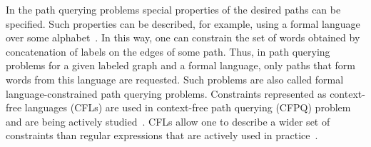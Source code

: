 In the path querying problems special properties of the desired paths can be specified. Such properties can be described, for example, using a formal language over some alphabet~\cite{barrett2000formal}. In this way, one can constrain the set of words obtained by concatenation of labels on the edges of some path. Thus, in path querying problems for a given labeled graph and a formal language, only paths that form words from this language are requested. Such problems are also called formal language-constrained path querying problems. Constraints represented as context-free languages (CFLs) are used in context-free path querying (CFPQ) problem and are being actively studied~\cite{rehof2001type,reps1998program,bradford2017efficient,hellings2014conjunctive,hellings2020explaining}. CFLs allow one to describe a wider set of constraints than regular expressions that are actively used in practice~\cite{koschmieder2012regular,calvanese2000answering}.

